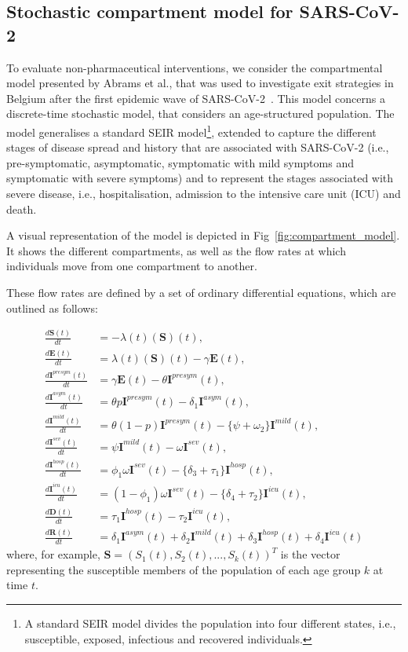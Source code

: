 \documentclass{article}
\renewcommand{\cite}[1]{\citep{#1}}
\newcommand{\agegroup}{k}
\begin{document}
\subsection{Stochastic compartment model for SARS-CoV-2}
\label{sec:sars-cov2-momdp_model}
To evaluate non-pharmaceutical interventions, we consider the compartmental model presented by Abrams et al., that was used to investigate exit strategies in Belgium after the first epidemic wave of SARS-CoV-2~\cite{abrams2021modelling}. This model concerns a discrete-time stochastic model, that considers an age-structured population. The model generalises a standard SEIR model\footnote{A standard SEIR model divides the population into four different states, i.e., susceptible, exposed, infectious and recovered individuals.}, extended to capture the different stages of disease spread and history that are associated with SARS-CoV-2 (i.e., pre-symptomatic, asymptomatic, symptomatic with mild symptoms and symptomatic with severe symptoms) and to represent the stages associated with severe disease, i.e., hospitalisation, admission to the intensive care unit (ICU) and death.

A visual representation of the model is depicted in Fig~\ref{fig:compartment_model}. It shows the different compartments, as well as the flow rates at which individuals move from one compartment to another.

These flow rates are defined by a set of ordinary differential equations, which are outlined as follows:

\begin{align*}
\frac{d\textbf{S}(t)}{dt} & = -\lambda(t)(\textbf{S})(t), \\
%
\frac{d\textbf{E}(t)}{dt} & = \lambda(t)(\textbf{S})(t) - \gamma \textbf{E}(t), \\
%
\frac{d\textbf{I}^{presym}(t)}{dt} & = \gamma \textbf{E}(t) - \theta \textbf{I}^{presym}(t), \\
%
\frac{d\textbf{I}^{asym}(t)}{dt} & = \theta p \textbf{I}^{presym}(t) - \delta_{1} \textbf{I}^{asym}(t), \\
%
\frac{d\textbf{I}^{mild}(t)}{dt} & = \theta (1 - p) \textbf{I}^{presym}(t) - \{ \psi + \omega_{2} \} \textbf{I}^{mild}(t), \\
%
\frac{d\textbf{I}^{sev}(t)}{dt} & = \psi \textbf{I}^{mild}(t) - \omega \textbf{I}^{sev}(t), \\
%
\frac{d\textbf{I}^{hosp}(t)}{dt} & = \phi_{1} \omega \textbf{I}^{sev}(t) - \{ \delta_{3} + \tau_{1} \} \textbf{I}^{hosp}(t), \\
%
\frac{d\textbf{I}^{icu}(t)}{dt} & = (1 - \phi_1) \omega \textbf{I}^{sev}(t) - \{ \delta_{4} + \tau_{2} \} \textbf{I}^{icu}(t), \\
%
\frac{d\textbf{D}(t)}{dt} & = \tau_{1} \textbf{I}^{hosp}(t) - \tau_{2} \textbf{I}^{icu}(t), \\
%
\frac{d\textbf{R}(t)}{dt} & = \delta_{1} \textbf{I}^{asym}(t) + \delta_{2} \textbf{I}^{mild}(t) + \delta_{3} \textbf{I}^{hosp}(t) + \delta_{4} \textbf{I}^{icu}(t)
\end{align*}
%
where, for example, $\textbf{S} = (S_{1}(t), S_{2}(t), ..., S_{\agegroup}(t))^{T}$ is the vector representing the susceptible members of the population of each age group $\agegroup$ at time $t$. 
\end{document}
